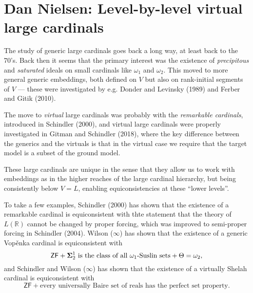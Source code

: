 \documentclass{amsart}
\theoremstyle{definition}
\begin{document}
\section{Dan Nielsen: Level-by-level virtual large cardinals}

The study of generic large cardinals goes back a long way, at least back to the 70's. Back then it seems that the primary interest was the existence of \textit{precipitous} and \textit{saturated} ideals on small cardinals like $\omega_1$ and $\omega_2$. This moved to more general generic embeddings, both defined on $V$ but also on rank-initial segments of $V$ --- these were investigated by e.g. Donder and Levinsky (1989) and Ferber and Gitik (2010).

The move to \textit{virtual} large cardinals was probably with the \textit{remarkable cardinals}, introduced in Schindler (2000), and virtual large cardinals were properly investigated in Gitman and Schindler (2018), where the key difference between the generics and the virtuals is that in the virtual case we require that the target model is a subset of the ground model.

These large cardinals are unique in the sense that they allow us to work with embeddings as in the higher reaches of the large cardinal hierarchy, but being consistently below $V=L$, enabling equiconsistencies at these ``lower levels''.

To take a few examples, Schindler (2000) has shown that the existence of a remarkable cardinal is equiconsistent with thte statement that the theory of $L(\mathbb R)$ cannot be changed by proper forcing, which was improved to semi-proper forcing in Schindler (2004). Wilson ($\infty$) has shown that the existence of a generic Vop\v enka cardinal is equiconsistent with
\[
  \textsf{ZF} + \text{${\bf\Sigma}^1_2$ is the class of all $\omega_1$-Suslin sets} + \Theta = \omega_2,
\]
and Schindler and Wilson ($\infty$) has shown that the existence of a virtually Shelah cardinal is equiconsistent with
\[
  \textsf{ZF} + \text{every universally Baire set of reals has the perfect set property}.
\]
\end{document}
